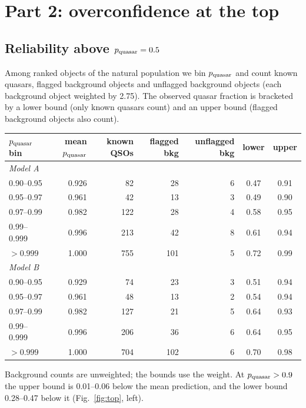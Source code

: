 \documentclass[11pt,a4paper]{article}
\newcommand{\pq}{p_{\rm quasar}}
\begin{document}
\section{Part 2: overconfidence at the top}
\subsection{Reliability above $\pq=0.5$}
Among ranked objects of the natural population we bin $\pq$ and count known quasars, flagged background objects
and unflagged background objects (each background object weighted by 2.75). The observed quasar fraction is
bracketed by a lower bound (only known quasars count) and an upper bound (flagged background objects also count).

\begin{center}\small
\begin{tabular}{lrrrrcc}
\toprule
$\pq$ bin & mean $\pq$ & known QSOs & flagged bkg & unflagged bkg & lower & upper \\
\midrule
\multicolumn{7}{l}{\emph{Model A}} \\
0.90--0.95 & 0.926 & 82 & 28 & 6 & 0.47 & 0.91 \\
0.95--0.97 & 0.961 & 42 & 13 & 3 & 0.49 & 0.90 \\
0.97--0.99 & 0.982 & 122 & 28 & 4 & 0.58 & 0.95 \\
0.99--0.999 & 0.996 & 213 & 42 & 8 & 0.61 & 0.94 \\
$>0.999$ & 1.000 & 755 & 101 & 5 & 0.72 & 0.99 \\
\multicolumn{7}{l}{\emph{Model B}} \\
0.90--0.95 & 0.929 & 74 & 23 & 3 & 0.51 & 0.94 \\
0.95--0.97 & 0.961 & 48 & 13 & 2 & 0.54 & 0.94 \\
0.97--0.99 & 0.982 & 127 & 21 & 5 & 0.64 & 0.93 \\
0.99--0.999 & 0.996 & 206 & 36 & 6 & 0.64 & 0.95 \\
$>0.999$ & 1.000 & 704 & 102 & 6 & 0.70 & 0.98 \\
\bottomrule
\end{tabular}
\end{center}
Background counts are unweighted; the bounds use the weight. At $\pq>0.9$ the upper bound is 0.01--0.06 below the mean
prediction, and the lower bound 0.28--0.47 below it (Fig.~\ref{fig:top}, left).
\end{document}
